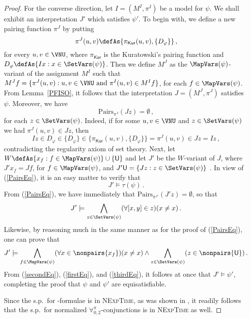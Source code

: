 \documentclass[submission,copyright,creativecommons]{eptcs}
\newcommand{\Lang}{\ensuremath{\mathbf{\forall}^{\pi}_{0,2}}\xspace}
\newcommand{\assignment}[1]{M^{#1}}
\newcommand{\pairf}[1]{\pi^{#1}}
\newcommand{\inter}{I}
\newcommand{\ipairf}{\pairf{\inter}}
\newcommand{\iassignment}{\assignment{\inter}}
\newcommand{\interp}{J}
\newcommand{\ipairfp}{\pairf{\interp}}
\newcommand{\iassignmentp}{\assignment{\interp}}
\newcommand{\pairs}[2]{\mathrm{Pairs}_{\pi^{#1}}(#2)}
\newcommand{\myDelta}{D_{\varphi}}
\newcommand{\D}{\corr{\mathsf{U}}}
\newcommand{\svx}{x}
\newcommand{\svy}{y}
\newcommand{\svz}{z}
\newcommand{\mvx}{f}
\newcommand{\sx}{u}
\newcommand{\sy}{v}
\newcommand{\corr}[1]{#1}
\begin{document}
\begin{proof}
For the converse direction, let
$\inter = (\iassignment, \ipairf)$ be a model for $\psi$.  We shall
exhibit an interpretation $\interp'$ which satisfies $\psi'$.  To
begin with, we define a new pairing function $\ipairfp$ by putting
\[
 \ipairfp(\sx, \sy) \defAs \{ \pi_{\mathsf{Kur}}(\sx, \sy), \{\myDelta\}
 \}\,,
\]
for every $\sx, \sy \in \VNU$, where $\pi_{\mathsf{Kur}}$ is the
Kuratowski's pairing function and $\myDelta \defAs \{\inter \svx :
\svx \in \SetVars(\psi)\}$.  Then we define $\iassignmentp$ as the
$\MapVars(\psi)$-variant of the assignment $\iassignment$ such that
$\iassignmentp \mvx = \{ \ipairfp(\sx, \sy) : \sx, \sy \in \VNU
\text{ and } \ipairf(\sx, \sy) \in \iassignment \mvx\}$, for each
$\mvx \in \MapVars(\psi)$.  From Lemma~\ref{PFISO}, it follows that
the interpretation $\interp = (\iassignmentp, \ipairfp)$ satisfies
$\psi$.  
Moreover, we have
\begin{equation}
    \label{PairsEq}
    \pairs{\interp}{\interp \svz}=\emptyset\,,
\end{equation}
for each $\svz \in \SetVars(\psi)$.  
Indeed, if for some $\sx, \sy \in \VNU$
and $\svz \in \SetVars(\psi)$ we had $\ipairfp(\sx, \sy) \in
\interp \svz$, then
\[
\inter z \in \myDelta \in \{\myDelta\} \in \{ \pi_{\mathsf{Kur}}(\sx, \sy), \{\myDelta\}
 \} = \ipairfp(\sx, \sy) \in \interp \svz = \inter z\,,
\]
contradicting the regularity axiom of set theory. 
Next, let $W \defAs \{\svx_{\mvx} : \mvx \in \MapVars(\psi)\} \cup
\{\D\}$ and let $\interp'$ be the $W$-variant of $\interp$, where
$\interp' \svx_{\mvx} = \interp \mvx$, for $\mvx \in
\MapVars(\psi)$, and $\interp' \D = \{\interp \svz : \svz \in
\SetVars(\psi)\}$ .  In view of (\ref{PairsEq}), it is an easy
matter to verify that 
\begin{equation}\label{secondEq}
\interp' \models \tau(\psi)\,.
\end{equation}
From (\ref{PairsEq}), we have immediately that
$\pairs{\interp'}{\interp' \svz}=\emptyset$, so that
\begin{equation}\label{firstEq}
\interp' \models \bigwedge_{\svz \in \SetVars(\psi)} (\forall
[\svx,\svy] \in \svz)(\svx \neq \svx)\,.
\end{equation}
Likewise, by reasoning much in
the same manner as for the proof of (\ref{PairsEq}), one can prove
that
\begin{equation}
    \label{thirdEq}
\interp' \models \bigwedge_{\mvx \in \MapVars(\psi)} (\forall \svx
\in \nonpairs{\svx_\mvx})(\svx \neq \svx) \wedge 
\bigwedge_{\svz \in \SetVars(\psi)} (\svz \in \nonpairs{\D})\,.
\end{equation}
From (\ref{secondEq}), (\ref{firstEq}), and (\ref{thirdEq}), it 
follows at once that $\interp' \models \psi'$, completing the 
proof that $\psi$ and $\psi'$ are equisatisfiable.

Since the s.p.\ for \Forallpizero-formulae is in \textsc{NExpTime}, 
as was shown in \cite[Section~3.1]{CanLonNic2011}, it readily follows 
that the s.p.\ for normalized \Lang-conjunctions is in 
\textsc{NExpTime} as well.
\end{proof}
\end{document}
